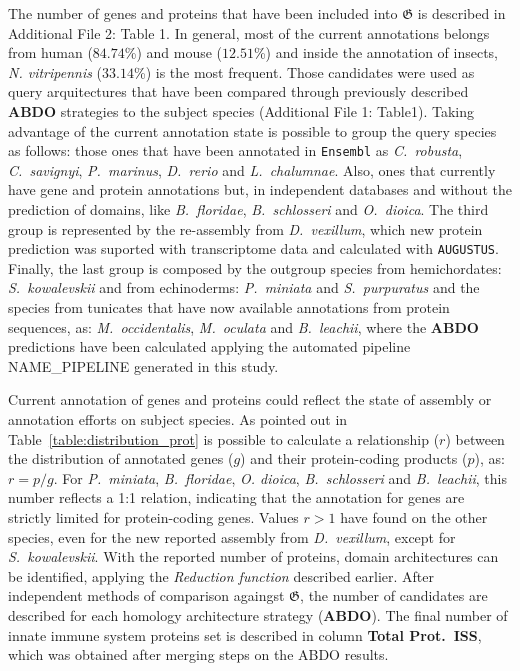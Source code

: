 \documentclass[11pt]{article}
\newcommand{\TODO}[1]{\begingroup\color{red}#1\endgroup}
\begin{document}
The number of genes and proteins that have been included into $\boldsymbol{\mathfrak{G}}$ 
is described in Additional File 2: Table 1. In general, most of the current 
annotations belongs from human ($84.74$\%) and mouse ($12.51$\%) and inside the 
annotation of insects, \textit{N. vitripennis} ($33.14$\%) is the most frequent. 
Those candidates were used as query arquitectures that have been compared through previously 
described \textbf{ABDO} strategies to the subject species (Additional File 1: Table1). 
Taking advantage of the current annotation state is possible to group the query 
species as follows: those ones that have been annotated in \texttt{Ensembl} as
\textit{C.\ robusta}, \textit{C.\ savignyi}, \textit{P.\ marinus}, \textit{D.\ 
rerio} and \textit{L.\ chalumnae}. Also, ones that currently have gene and protein annotations 
but, in independent databases and without the prediction of domains, like \textit{B.\ floridae}, 
\textit{B.\ schlosseri} and \textit{O.\ dioica}. The third group is represented
by the re-assembly from \textit{D.\ vexillum}, which new protein prediction was
suported with transcriptome data and calculated with \texttt{AUGUSTUS}. Finally, the last group 
is composed by the outgroup species from hemichordates: \textit{S.\ kowalevskii} and from 
echinoderms: \textit{P.\ miniata} and \textit{S.\ purpuratus} and the species from 
tunicates that have now available annotations from protein sequences, as: \textit{M.\ occidentalis}, 
\textit{M.\ oculata} and \textit{B.\ leachii}, where the \textbf{ABDO} predictions have 
been calculated applying the automated pipeline \TODO{NAME\_PIPELINE} generated
in this study.

Current annotation of genes and proteins could reflect the state of assembly
or annotation efforts on subject species. As pointed out in Table~\ref{table:distribution_prot}
is possible to calculate a relationship ($r$) between the distribution of annotated genes ($g$) and 
their protein-coding products ($p$), as: $r = p/g$. For \textit{P.\ miniata}, \textit{B.\ floridae}, 
\textit{O. dioica}, \textit{B.\ schlosseri} and \textit{B.\ leachii}, this number reflects a 
1:1 relation, indicating that the annotation for genes are strictly limited for
protein-coding genes. Values $r > 1$ have found on the other species, even for
the new reported assembly from \textit{D.\ vexillum}, except for \textit{S.\
kowalevskii}.
With the reported number of proteins, domain architectures can be identified,
applying the \textsl{Reduction function} described earlier. After independent
methods of comparison againgst $\boldsymbol{\mathfrak{G}}$, the number of
candidates are described for each homology architecture strategy
(\textbf{ABDO}). The final number of innate immune system proteins set is
described in column \textbf{Total Prot.\ ISS}, which was obtained after merging
steps on the ABDO results.
\end{document}
